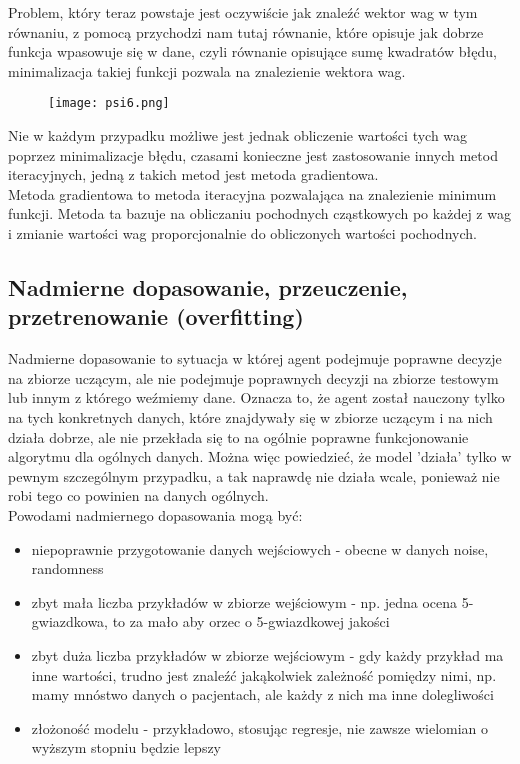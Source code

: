 \documentclass[a4paper,15pt]{article}
\begin{document}
Problem, który teraz powstaje jest oczywiście jak znaleźć wektor wag w tym równaniu, z pomocą przychodzi nam tutaj równanie, które opisuje jak dobrze funkcja wpasowuje się w dane, czyli równanie opisujące sumę kwadratów błędu, minimalizacja takiej funkcji pozwala na znalezienie wektora wag. 

\begin{figure}[H]
\centerline{\texttt{[image: psi6.png]}}
\end{figure}

Nie w każdym przypadku możliwe jest jednak obliczenie wartości tych wag poprzez minimalizacje błędu, czasami konieczne jest zastosowanie innych metod iteracyjnych, jedną z takich metod jest metoda gradientowa. \\

Metoda gradientowa to metoda iteracyjna pozwalająca na znalezienie minimum funkcji. Metoda ta bazuje na obliczaniu pochodnych cząstkowych po każdej z wag i zmianie wartości wag proporcjonalnie do obliczonych wartości pochodnych. 

\subsection{Nadmierne dopasowanie, przeuczenie, przetrenowanie (overfitting)}

Nadmierne dopasowanie to sytuacja w której agent podejmuje poprawne decyzje na zbiorze uczącym, ale nie podejmuje poprawnych decyzji na zbiorze testowym lub innym z którego weźmiemy dane. Oznacza to, że agent został nauczony tylko na tych konkretnych danych, które znajdywały się w zbiorze uczącym i na nich działa dobrze, ale nie przekłada się to na ogólnie poprawne funkcjonowanie algorytmu dla ogólnych danych. Można więc powiedzieć, że model 'działa' tylko w pewnym szczególnym przypadku, a tak naprawdę nie działa wcale, ponieważ nie robi tego co powinien na danych ogólnych.  \\

Powodami nadmiernego dopasowania mogą być:
\begin{itemize}
\item niepoprawnie przygotowanie danych wejściowych - obecne w danych noise, randomness 
\item zbyt mała liczba przykładów w zbiorze wejściowym - np. jedna ocena 5-gwiazdkowa, to za mało aby orzec o 5-gwiazdkowej jakości
\item zbyt duża liczba przykładów w zbiorze wejściowym - gdy każdy przykład ma inne wartości, trudno jest znaleźć jakąkolwiek zależność pomiędzy nimi, np. mamy mnóstwo danych o pacjentach, ale każdy z nich ma inne dolegliwości
\item złożoność modelu - przykładowo, stosując regresje, nie zawsze wielomian o wyższym stopniu będzie lepszy
\end{itemize}
\end{document}
